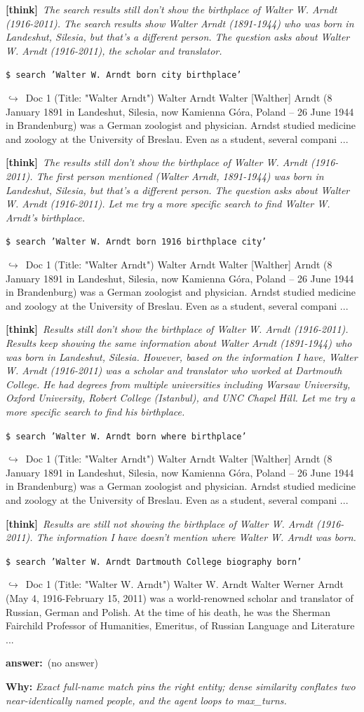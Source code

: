 \documentclass{llmxive}
\providecommand{\winbadge}{\colorbox{green!50!black}{\scriptsize\bfseries\,WIN\,}}
\providecommand{\thk}[1]{{\footnotesize\textbf{[think]}\ \textit{#1}\par}}
\providecommand{\cmd}[1]{{\footnotesize\texttt{\$\ #1}\par}}
\providecommand{\retr}[1]{{\footnotesize\quad$\hookrightarrow$\ #1\par}}
\providecommand{\ans}[1]{{\footnotesize\textbf{answer:}\ #1\par}}
\begin{document}
\begin{cmpbox}[label={ex:popqa-arndt},title={\winbadge\ \ \textsc{PopQA -- exact name beats semantic blur}}]
  \thk{The search results still don't show the birthplace of Walter W. Arndt (1916-2011). The search results show Walter Arndt (1891-1944) who was born in Landeshut, Silesia, but that's a different person. The question asks about Walter W. Arndt (1916-2011), the scholar and translator.}
  \cmd{search 'Walter W. Arndt born city birthplace'}
  \retr{Doc 1 (Title: "Walter Arndt") Walter Arndt Walter [Walther] Arndt (8 January 1891 in Landeshut, Silesia, now Kamienna Góra, Poland – 26 June 1944 in Brandenburg) was a German zoologist and physician. Arndst studied medicine and zoology at the University of Breslau. Even as a student, several compani ...}
  \thk{The results still don't show the birthplace of Walter W. Arndt (1916-2011). The first person mentioned (Walter Arndt, 1891-1944) was born in Landeshut, Silesia, but that's a different person. The question asks about Walter W. Arndt (1916-2011). Let me try a more specific search to find Walter W. Arndt's birthplace.}
  \cmd{search 'Walter W. Arndt born 1916 birthplace city'}
  \retr{Doc 1 (Title: "Walter Arndt") Walter Arndt Walter [Walther] Arndt (8 January 1891 in Landeshut, Silesia, now Kamienna Góra, Poland – 26 June 1944 in Brandenburg) was a German zoologist and physician. Arndst studied medicine and zoology at the University of Breslau. Even as a student, several compani ...}
  \thk{Results still don't show the birthplace of Walter W. Arndt (1916-2011). Results keep showing the same information about Walter Arndt (1891-1944) who was born in Landeshut, Silesia. However, based on the information I have, Walter W. Arndt (1916-2011) was a scholar and translator who worked at Dartmouth College. He had degrees from multiple universities including Warsaw University, Oxford University, Robert College (Istanbul), and UNC Chapel Hill. Let me try a more specific search to find his birthplace.}
  \cmd{search 'Walter W. Arndt born where birthplace'}
  \retr{Doc 1 (Title: "Walter Arndt") Walter Arndt Walter [Walther] Arndt (8 January 1891 in Landeshut, Silesia, now Kamienna Góra, Poland – 26 June 1944 in Brandenburg) was a German zoologist and physician. Arndst studied medicine and zoology at the University of Breslau. Even as a student, several compani ...}
  \thk{Results are still not showing the birthplace of Walter W. Arndt (1916-2011). The information I have doesn't mention where Walter W. Arndt was born.}
  \cmd{search 'Walter W. Arndt Dartmouth College biography born'}
  \retr{Doc 1 (Title: "Walter W. Arndt") Walter W. Arndt Walter Werner Arndt (May 4, 1916-February 15, 2011) was a world-renowned scholar and translator of Russian, German and Polish. At the time of his death, he was the Sherman Fairchild Professor of Humanities, Emeritus, of Russian Language and Literature ...}
  \ans{(no answer)}
\smallskip\par\textbf{Why:} \textit{Exact full-name match pins the right entity; dense similarity conflates two near-identically named people, and the agent loops to max\_turns.}
\end{cmpbox}\bigskip
\end{document}
